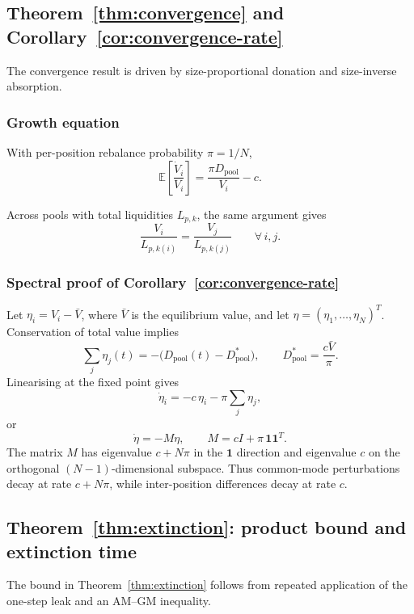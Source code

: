 \documentclass{manuscript}
\begin{document}
\subsection{Theorem~\ref{thm:convergence} and Corollary~\ref{cor:convergence-rate}}

The convergence result is driven by size-proportional donation and size-inverse absorption.

\subsubsection*{Growth equation}

With per-position rebalance probability $\pi = 1/N$,
\begin{equation}\label{eq:growth-app}
\mathbb{E}\!\left[\frac{\dot{V}_i}{V_i}\right]
=
\frac{\pi D_{\text{pool}}}{V_i} - c.
\end{equation}

Across pools with total liquidities $L_{p,k}$, the same argument gives
\begin{equation}\label{eq:multipool-app}
\frac{V_i}{L_{p,k(i)}}
=
\frac{V_j}{L_{p,k(j)}}
\qquad \forall\, i,j.
\end{equation}

\subsubsection*{Spectral proof of Corollary~\ref{cor:convergence-rate}}

Let $\eta_i = V_i - \bar V$, where $\bar V$ is the equilibrium value, and let $\eta = (\eta_1, \ldots, \eta_N)^T$. Conservation of total value implies
\[
\sum_j \eta_j(t) = -\bigl(D_{\text{pool}}(t) - D_{\text{pool}}^*\bigr),
\qquad
D_{\text{pool}}^* = \frac{c\bar V}{\pi}.
\]
Linearising at the fixed point gives
\[
\dot\eta_i = -c\,\eta_i - \pi \sum_j \eta_j,
\]
or
\[
\dot\eta = -M\eta,
\qquad
M = cI + \pi\,\mathbf{1}\mathbf{1}^T.
\]
The matrix $M$ has eigenvalue $c + N\pi$ in the $\mathbf{1}$ direction and eigenvalue $c$ on the orthogonal $(N-1)$-dimensional subspace. Thus common-mode perturbations decay at rate $c + N\pi$, while inter-position differences decay at rate $c$.

\subsection{Theorem~\ref{thm:extinction}: product bound and extinction time}

The bound in Theorem~\ref{thm:extinction} follows from repeated application of the one-step leak and an AM--GM inequality.
\end{document}
